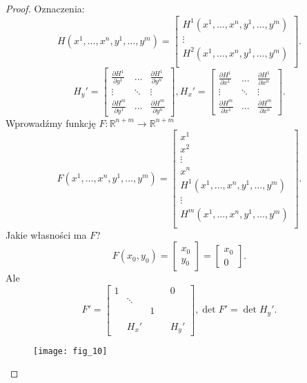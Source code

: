 \documentclass[../main.tex]{subfiles}
\begin{document}
\begin{proof}
    Oznaczenia:
    \[
        H(x^1,\ldots,x^n,y^1,\ldots,y^m) = \begin{bmatrix}
        H^1(x^1,\ldots,x^n,y^1,\ldots,y^m)\\
        \vdots\\
        H^2(x^1,\ldots,x^n,y^1,\ldots,y^m)\\
    \end{bmatrix}
    .\]
    \[
    H_y' = \begin{bmatrix}
    \frac{\partial H^1}{\partial y^1} &\ldots&\frac{\partial H^1}{\partial y^n} \\
    \vdots&\ddots&\vdots\\
\frac{\partial H^m}{\partial y^1} &\ldots&\frac{\partial H^m}{\partial y^n} \end{bmatrix},
    H_x' = \begin{bmatrix}
    \frac{\partial H^1}{\partial x^1} &\ldots&\frac{\partial H^1}{\partial x^n} \\
    \vdots&\ddots&\vdots\\
\frac{\partial H^m}{\partial x^1} &\ldots&\frac{\partial H^m}{\partial x^n} \end{bmatrix}
    .\]
    Wprowadźmy funkcję $F:\mathbb{R}^{n+m}\to\mathbb{R}^{n+m}$
    \[
        F(x^1,\ldots,x^n,y^1,\ldots,y^m) = \begin{bmatrix}
        x^1\\
    x^2\\
\vdots\\
x^n\\
H^1(x^1,\ldots,x^n,y^1,\ldots,y^m)\\
\vdots\\
H^m(x^1,\ldots,x^n,y^1,\ldots,y^m)\\
\end{bmatrix}
    .\]
    Jakie własności ma $F$?
    \[
        F(x_0,y_0) = \begin{bmatrix}
        x_0\\
        y_0\end{bmatrix} = \begin{bmatrix}
        x_0\\
        0\end{bmatrix}
    .\]
    Ale \[
    F' = \begin{bmatrix}
        1&&&&0\\
         &\ddots&&&\\
         &&1&&\\
         &&&&\\
         &H_x'&&&H_y'
    \end{bmatrix}, \det F' = \det H_y'
    .\]
    \begin{figure}[h]
        \centering
        \texttt{[image: fig\_10]}
        \caption{}
        \label{fig:}
    \end{figure}


\end{proof}
\end{document}
